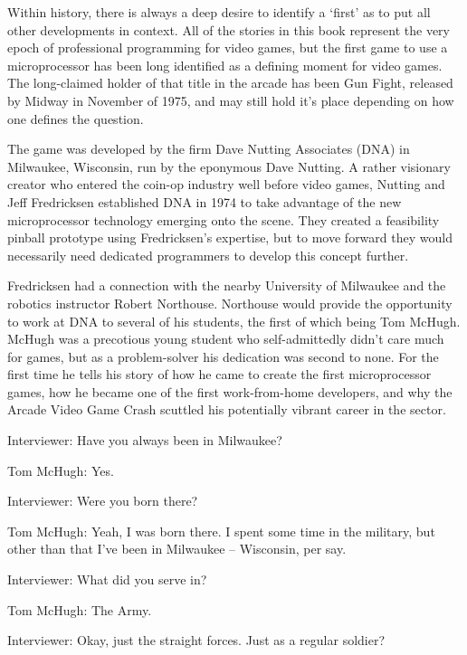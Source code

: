 Within history, there is always a deep desire to identify a ‘first’ as to put all other developments in context. All of the stories in this book represent the very epoch of professional programming for video games, but the first game to use a microprocessor has been long identified as a defining moment for video games. The long-claimed holder of that title in the arcade has been Gun Fight, released by Midway in November of 1975, and may still hold it’s place depending on how one defines the question.

The game was developed by the firm Dave Nutting Associates (DNA) in Milwaukee, Wisconsin, run by the eponymous Dave Nutting. A rather visionary creator who entered the coin-op industry well before video games, Nutting and Jeff Fredricksen established DNA in 1974 to take advantage of the new microprocessor technology emerging onto the scene. They created a feasibility pinball prototype using Fredricksen’s expertise, but to move forward they would necessarily need dedicated programmers to develop this concept further.

Fredricksen had a connection with the nearby University of Milwaukee and the robotics instructor Robert Northouse. Northouse would provide the opportunity to work at DNA to several of his students, the first of which being Tom McHugh. McHugh was a precotious young student who self-admittedly didn’t care much for games, but as a problem-solver his dedication was second to none. For the first time he tells his story of how he came to create the first microprocessor games, how he became one of the first work-from-home developers, and why the Arcade Video Game Crash scuttled his potentially vibrant career in the sector.

\noindent\makebox[\linewidth]{\rule{\paperwidth}{0.4pt}}

\textcolor{interviewer}{Interviewer:} Have you always been in Milwaukee?

\textcolor{interviewee}{Tom McHugh:} Yes.

\textcolor{interviewer}{Interviewer:} Were you born there?

\textcolor{interviewee}{Tom McHugh:} Yeah, I was born there. I spent some time in the military, but other than that I’ve been in Milwaukee – Wisconsin, per say.

\textcolor{interviewer}{Interviewer:} What did you serve in?

\textcolor{interviewee}{Tom McHugh:} The Army.

\textcolor{interviewer}{Interviewer:} Okay, just the straight forces. Just as a regular soldier?

